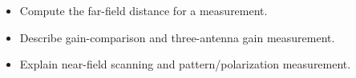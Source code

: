 \begin{objectives}
\begin{itemize}[leftmargin=1.4em,itemsep=2pt]
\item Compute the far-field distance for a measurement.
\item Describe gain-comparison and three-antenna gain measurement.
\item Explain near-field scanning and pattern/polarization measurement.
\end{itemize}
\end{objectives}
